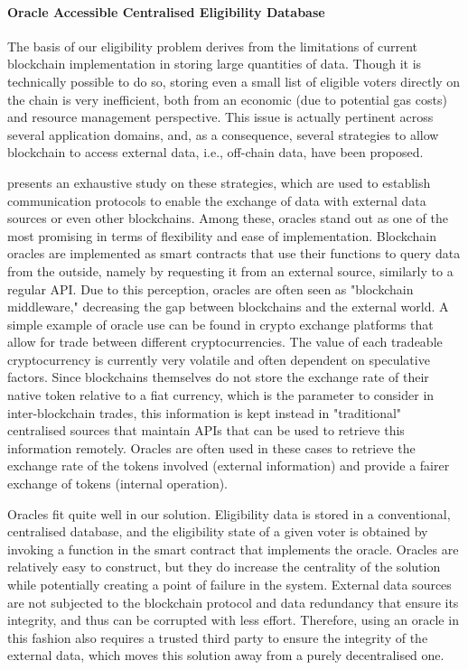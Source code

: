\documentclass[../main.tex]{subfiles}
\begin{document}
            \paragraph{Oracle Accessible Centralised Eligibility Database}
            \label{centralised_eligibility_database}
                The basis of our eligibility problem derives from the limitations of current blockchain implementation in storing large quantities of data. Though it is technically possible to do so, storing even a small list of eligible voters directly on the chain is very inefficient, both from an economic (due to potential gas costs) and resource management perspective. This issue is actually pertinent across several application domains, and, as a consequence, several strategies to allow blockchain to access external data, i.e., off-chain data, have been proposed.
                \par
                \cite{Ezzat2022} presents an exhaustive study on these strategies, which are used to establish communication protocols to enable the exchange of data with external data sources or even other blockchains. Among these, oracles stand out as one of the most promising in terms of flexibility and ease of implementation. Blockchain oracles are implemented as smart contracts that use their functions to query data from the outside, namely by requesting it from an external source, similarly to a regular API. Due to this perception, oracles are often seen as "blockchain middleware," decreasing the gap between blockchains and the external world. A simple example of oracle use can be found in crypto exchange platforms that allow for trade between different cryptocurrencies. The value of each tradeable cryptocurrency is currently very volatile and often dependent on speculative factors. Since blockchains themselves do not store the exchange rate of their native token relative to a fiat currency, which is the parameter to consider in inter-blockchain trades, this information is kept instead in "traditional" centralised sources that maintain APIs that can be used to retrieve this information remotely. Oracles are often used in these cases to retrieve the exchange rate of the tokens involved (external information) and provide a fairer exchange of tokens (internal operation).
                \par
                Oracles fit quite well in our solution. Eligibility data is stored in a conventional, centralised database, and the eligibility state of a given voter is obtained by invoking a function in the smart contract that implements the oracle. Oracles are relatively easy to construct, but they do increase the centrality of the solution while potentially creating a point of failure in the system. External data sources are not subjected to the blockchain protocol and data redundancy that ensure its integrity, and thus can be corrupted with less effort. Therefore, using an oracle in this fashion also requires a trusted third party to ensure the integrity of the external data, which moves this solution away from a purely decentralised one.
\end{document}
